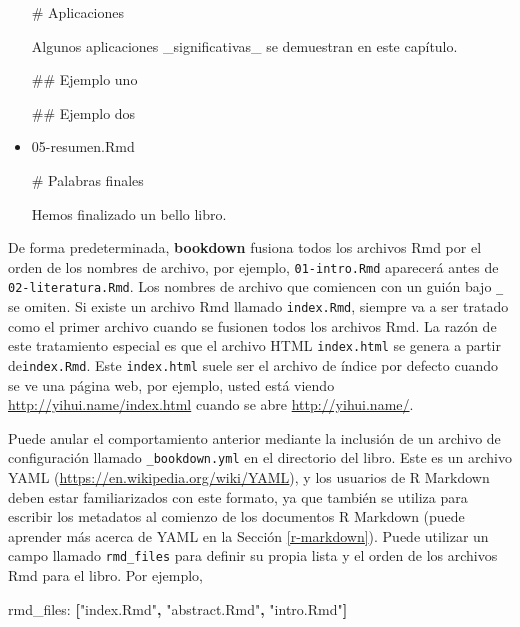 \documentclass[12pt,]{krantz}
\makeatletter
\newenvironment{Shaded}{\begin{snugshade}}{\end{snugshade}}
\newcommand{\KeywordTok}[1]{\textcolor[rgb]{0.13,0.29,0.53}{\textbf{#1}}}
\newcommand{\StringTok}[1]{\textcolor[rgb]{0.31,0.60,0.02}{#1}}
\newcommand{\FunctionTok}[1]{\textcolor[rgb]{0.00,0.00,0.00}{#1}}
\newcommand{\AttributeTok}[1]{\textcolor[rgb]{0.77,0.63,0.00}{#1}}
\newcommand{\NormalTok}[1]{#1}
\newenvironment{kframe}{%
\medskip{}
\setlength{\fboxsep}{.8em}
 \def\at@end@of@kframe{}%
 \ifinner\ifhmode%
  \def\at@end@of@kframe{\end{minipage}}%
  \begin{minipage}{\columnwidth}%
 \fi\fi%
 \def\FrameCommand##1{\hskip\@totalleftmargin \hskip-\fboxsep
 \colorbox{shadecolor}{##1}\hskip-\fboxsep
     \hskip-\linewidth \hskip-\@totalleftmargin \hskip\columnwidth}%
 \MakeFramed {\advance\hsize-\width
   \@totalleftmargin\z@ \linewidth\hsize
   \@setminipage}}%
 {\par\unskip\endMakeFramed%
 \at@end@of@kframe}
\renewenvironment{Shaded}{\begin{kframe}}{\end{kframe}}
\theoremstyle{definition}
\theoremstyle{definition}
\theoremstyle{definition}
\theoremstyle{remark}
\makeatother
\begin{document}
\begin{itemize}
\begin{Shaded}
\begin{Highlighting}[]
\FunctionTok{# Aplicaciones}

\NormalTok{Algunos aplicaciones _significativas_ se demuestran}
\NormalTok{en este capítulo.}

\FunctionTok{## Ejemplo uno}

\FunctionTok{## Ejemplo dos}
\end{Highlighting}
\end{Shaded}
\item
  05-resumen.Rmd

\begin{Shaded}
\begin{Highlighting}[]
\FunctionTok{# Palabras finales}

\NormalTok{Hemos finalizado un bello libro.}
\end{Highlighting}
\end{Shaded}
\end{itemize}

De forma predeterminada, \textbf{bookdown} fusiona todos los archivos
Rmd por el orden de los nombres de archivo, por ejemplo,
\texttt{01-intro.Rmd} aparecerá antes de \texttt{02-literatura.Rmd}. Los
nombres de archivo que comiencen con un guión bajo \texttt{\_} se
omiten. Si existe un archivo Rmd llamado \texttt{index.Rmd}, siempre va
a ser tratado como el primer archivo cuando se fusionen todos los
archivos Rmd. La razón de este tratamiento especial es que el archivo
HTML \texttt{index.html} se genera a partir de\texttt{index.Rmd}. Este
\texttt{index.html} suele ser el archivo de índice por defecto cuando se
ve una página web, por ejemplo, usted está viendo
\url{http://yihui.name/index.html} cuando se abre
\url{http://yihui.name/}.

Puede anular el comportamiento anterior mediante la inclusión de un
archivo de configuración llamado \texttt{\_bookdown.yml} en el
directorio del libro. Este es un archivo YAML
(\url{https://en.wikipedia.org/wiki/YAML}), y los usuarios de R Markdown
deben estar familiarizados con este formato, ya que también se utiliza
para escribir los metadatos al comienzo de los documentos R Markdown
(puede aprender más acerca de YAML en la Sección \ref{r-markdown}).
Puede utilizar un campo llamado \texttt{rmd\_files} para definir su
propia lista y el orden de los archivos Rmd para el libro. Por ejemplo,

\begin{Shaded}
\begin{Highlighting}[]
\FunctionTok{rmd_files:}\AttributeTok{ }\KeywordTok{[}\StringTok{"index.Rmd"}\KeywordTok{,} \StringTok{"abstract.Rmd"}\KeywordTok{,} \StringTok{"intro.Rmd"}\KeywordTok{]}
\end{Highlighting}
\end{Shaded}
\end{document}
